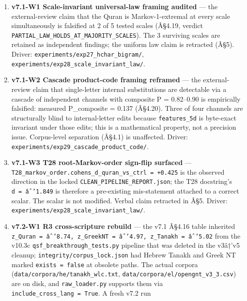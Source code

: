 \documentclass[
]{article}
\begin{document}
\begin{enumerate}
  required two adversarial audit rounds before bless (13 + 5 FATAL, 21 +
  8 WARN). The resulting audit protocol is now the standing acceptance
  criterion for any future R-channel addition (any R12+). Audit logs:
  \texttt{archive/audits/}.
\item
  \textbf{v7.1-W1 Scale-invariant universal-law framing audited} --- the
  external-review claim that the Quran is Markov-1-extremal at every
  scale simultaneously is falsified at 2 of 5 tested scales (Â§4.19,
  verdict \texttt{PARTIAL\_LAW\_HOLDS\_AT\_MAJORITY\_SCALES}). The 3
  surviving scales are retained as independent findings; the uniform law
  claim is retracted (Â§5). Driver:
  \texttt{experiments/exp27\_hchar\_bigram/},
  \texttt{experiments/exp28\_scale\_invariant\_law/}.
\item
  \textbf{v7.1-W2 Cascade product-code framing reframed} --- the
  external-review claim that single-letter internal substitutions are
  detectable via a cascade of independent channels with composite P =
  0.82--0.90 is empirically falsified: measured P\_composite = 0.137
  (Â§4.20). Three of four channels are structurally blind to
  internal-letter edits because \texttt{features\_5d} is byte-exact
  invariant under those edits; this is a mathematical property, not a
  precision issue. Corpus-level separation (Â§4.1) is unaffected.
  Driver: \texttt{experiments/exp29\_cascade\_product\_code/}.
\item
  \textbf{v7.1-W3 T28 root-Markov-order sign-flip surfaced} ---
  \texttt{T28\_markov\_order.cohens\_d\_quran\_vs\_ctrl\ =\ +0.425} is
  the observed direction in the locked
  \texttt{CLEAN\_PIPELINE\_REPORT.json}; the T28 docstring's
  \texttt{d\ =\ âˆ’1.849} is therefore a pre-existing mis-statement
  attached to a correct scalar. The scalar is not modified. Verbal claim
  retracted in Â§5. Driver:
  \texttt{experiments/exp28\_scale\_invariant\_law/}.
\item
  \textbf{v7.2-W1 R3 cross-scripture rebuild} --- the v7.1 Â§4.16 table
  inherited
  \texttt{z\_Quran\ =\ âˆ’8.74,\ z\_GreekNT\ =\ âˆ’4.97,\ z\_Tanakh\ =\ âˆ’5.02}
  from the v10.3c \texttt{qsf\_breakthrough\_tests.py} pipeline that was
  deleted in the v3â†'v5 cleanup; \texttt{integrity/corpus\_lock.json}
  had Hebrew Tanakh and Greek NT marked \texttt{exists\ =\ false} at
  obsolete paths. The actual corpora
  (\texttt{data/corpora/he/tanakh\_wlc.txt},
  \texttt{data/corpora/el/opengnt\_v3\_3.csv}) are on disk, and
  \texttt{raw\_loader.py} supports them via
  \texttt{include\_cross\_lang\ =\ True}. A fresh v7.2 run

\end{enumerate}
\end{document}
